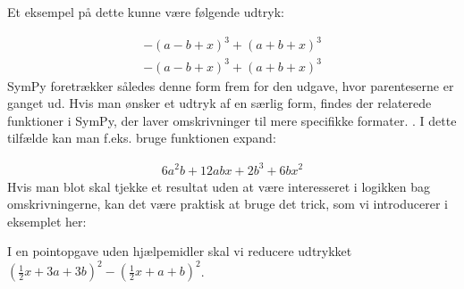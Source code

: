 \documentclass[letterpaper,10pt,english]{jupyterBook}
\begin{document}
Et eksempel på dette kunne være følgende udtryk:

\begin{sphinxVerbatim}[commandchars=\\\{\}]
    
\end{sphinxVerbatim}
\begin{equation*}
\begin{split}\displaystyle - \left(a - b + x\right)^{3} + \left(a + b + x\right)^{3}\end{split}
\end{equation*}\begin{equation*}
\begin{split}\displaystyle - \left(a - b + x\right)^{3} + \left(a + b + x\right)^{3}\end{split}
\end{equation*}
SymPy foretrækker således denne form frem for den udgave, hvor parenteserne er ganget ud.
Hvis man ønsker et udtryk af en særlig form, findes der relaterede funktioner i SymPy, der laver omskrivninger til mere specifikke formater. . I dette tilfælde kan man f.eks. bruge funktionen expand:

\begin{sphinxVerbatim}[commandchars=\\\{\}]
\end{sphinxVerbatim}
\begin{equation*}
\begin{split}\displaystyle 6 a^{2} b + 12 a b x + 2 b^{3} + 6 b x^{2}\end{split}
\end{equation*}
Hvis man blot skal tjekke et resultat uden at være interesseret i logikken bag omskrivningerne, kan det være praktisk at bruge det trick, som vi introducerer i eksemplet her:

I en pointopgave uden hjælpemidler skal vi reducere udtrykket \((\frac{1}{2}x+3a+3b)^2 - (\frac{1}{2}x+a+b)^2\).
\end{document}
